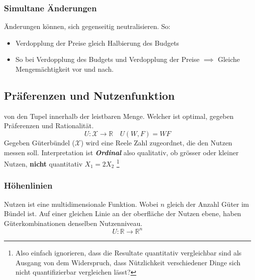\subsubsection{Simultane Änderungen}
Änderungen können, sich gegenseitig neutralisieren. So: 
\begin{itemize}
    \item Verdopplung der Preise gleich Halbierung des Budgets
    \item So bei Verdopplung des Budgets und Verdopplung der Preise $\implies$ Gleiche Mengemächtigkeit vor und nach.
\end{itemize}
\pagebreak
\subsection{Präferenzen und Nutzenfunktion }
\begin{definition}
    [Nutzenfunktion U] von den Tupel innerhalb der leistbaren Menge. Welcher ist optimal, gegeben Präferenzen und Rationalität.
    \begin{equation}
        U: \mathcal{X} \rightarrow \mathbb{R} \quad U(W,F) = WF
    \end{equation}
    Gegeben Güterbündel ($\mathcal{X}$) wird eine Reele Zahl zugeordnet, die den Nutzen messen soll.
    Interpretation ist \textit{\textbf{Ordinal}} also qualitativ, ob grösser oder kleiner Nutzen, \textbf{nicht} quantitativ $X_1 = 2 X_2$ \footnote{Also einfach ignorieren, dass die Resultate quantitativ vergleichbar sind als Ausgang von dem Widerspruch, dass Nützlichkeit verschiedener Dinge sich nicht quantifizierbar vergleichen lässt?}
\end{definition}

\subsubsection{Höhenlinien}
Nutzen ist eine multidimensionale Funktion. Wobei $n$ gleich der Anzahl Güter im Bündel ist. Auf einer gleichen Linie an der oberfläche der Nutzen ebene, haben Güterkombinationen denselben Nutzenniveau.
\begin{equation}
    U: \mathbb{R} \rightarrow \mathbb{R}^{n}
\end{equation}
